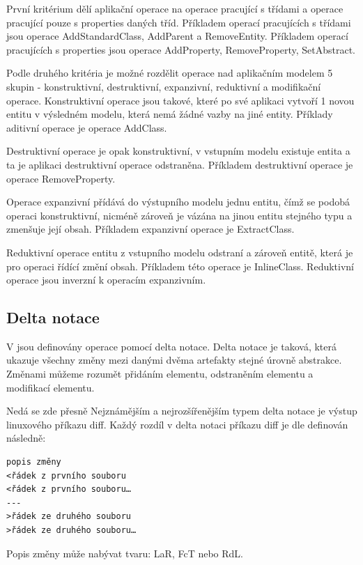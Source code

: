 \documentclass[11pt,twoside,a4paper]{book}
\begin{document}
První kritérium dělí aplikační operace na operace pracující s třídami a operace
pracující pouze s properties daných tříd. Příkladem operací pracujících s
třídami jsou operace AddStandardClass, AddParent a RemoveEntity. Příkladem
operací pracujících s properties jsou operace AddProperty, RemoveProperty,
SetAbstract.

Podle druhého kritéria je možné rozdělit operace nad aplikačním modelem 5 skupin
- konstruktivní, destruktivní, expanzivní, reduktivní a modifikační operace.
Konstruktivní operace jsou takové, které po své aplikaci vytvoří 1 novou entitu
v výsledném modelu, která nemá žádné vazby na jiné entity. Příklady aditivní
operace je operace AddClass. 

Destruktivní operace je opak konstruktivní, v vstupním modelu existuje entita a
ta je aplikaci destruktivní operace odstraněna. Příkladem destruktivní operace
je operace RemoveProperty.

Operace expanzivní přídává do výstupního modelu jednu entitu, čímž se
podobá operaci konstruktivní, nicméně zároveň je vázána na jinou entitu stejného typu a
zmenšuje její obsah. Příkladem expanzivní operace je ExtractClass. 

Reduktivní operace entitu z vstupního modelu odstraní a zároveň entitě, která
je pro operaci řídící změní obsah. Příkladem této operace je InlineClass.
Reduktivní operace jsou inverzní k operacím expanzivním.\\

\subsection{Delta notace}
V \cite{Cincetti} jsou definovány operace pomocí delta notace. Delta notace
je taková, která ukazuje všechny změny mezi danými dvěma artefakty stejné
úrovně abstrakce. Změnami můžeme rozumět přidáním elementu, odstraněním elementu
a modifikací elementu.

Nedá se zde přesně Nejznámějším a nejrozšířenějším typem delta notace je výstup
linuxového příkazu diff. Každý rozdíl v delta notaci příkazu diff je dle
\cite{diff_wiki} definován následně:

\begin{verbatim}
popis změny
<řádek z prvního souboru
<řádek z prvního souboru…
---
>řádek ze druhého souboru
>řádek ze druhého souboru…
\end{verbatim}

Popis změny může nabývat tvaru: LaR, FcT nebo RdL.\\
\end{document}
